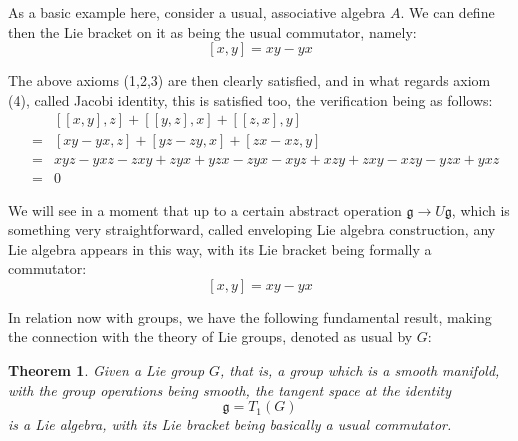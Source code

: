 \documentclass[12pt]{amsbook}
\newtheorem{theorem}{Theorem}[chapter]
\begin{document}
As a basic example here, consider a usual, associative algebra $A$. We can define then the Lie bracket on it as being the usual commutator, namely:
$$[x,y]=xy-yx$$

The above axioms (1,2,3) are then clearly satisfied, and in what regards axiom (4), called Jacobi identity, this is satisfied too, the verification being as follows:
\begin{eqnarray*}
&&[[x,y],z]+[[y,z],x]+[[z,x],y]\\
&=&[xy-yx,z]+[yz-zy,x]+[zx-xz,y]\\
&=&xyz-yxz-zxy+zyx+yzx-zyx-xyz+xzy+zxy-xzy-yzx+yxz\\
&=&0
\end{eqnarray*}

We will see in a moment that up to a certain abstract operation $\mathfrak g\to U\mathfrak g$, which is something very straightforward, called enveloping Lie algebra construction, any Lie algebra appears in this way, with its Lie bracket being formally a commutator:
$$[x,y]=xy-yx$$

In relation now with groups, we have the following fundamental result, making the connection with the theory of Lie groups, denoted as usual by $G$:

\begin{theorem}
Given a Lie group $G$, that is, a group which is a smooth manifold, with the group operations being smooth, the tangent space at the identity
$$\mathfrak g=T_1(G)$$
is a Lie algebra, with its Lie bracket being basically a usual commutator.
\end{theorem}
\end{document}
